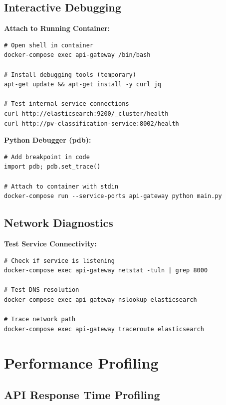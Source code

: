 \subsection{Interactive Debugging}

\textbf{Attach to Running Container:}
\begin{commandbox}
\begin{lstlisting}[style=bashstyle]
# Open shell in container
docker-compose exec api-gateway /bin/bash

# Install debugging tools (temporary)
apt-get update && apt-get install -y curl jq

# Test internal service connections
curl http://elasticsearch:9200/_cluster/health
curl http://pv-classification-service:8002/health
\end{lstlisting}
\end{commandbox}

\textbf{Python Debugger (pdb):}
\begin{lstlisting}[style=pythonstyle]
# Add breakpoint in code
import pdb; pdb.set_trace()

# Attach to container with stdin
docker-compose run --service-ports api-gateway python main.py
\end{lstlisting}

\subsection{Network Diagnostics}

\textbf{Test Service Connectivity:}
\begin{commandbox}
\begin{lstlisting}[style=bashstyle]
# Check if service is listening
docker-compose exec api-gateway netstat -tuln | grep 8000

# Test DNS resolution
docker-compose exec api-gateway nslookup elasticsearch

# Trace network path
docker-compose exec api-gateway traceroute elasticsearch
\end{lstlisting}
\end{commandbox}

\section{Performance Profiling}

\subsection{API Response Time Profiling}

